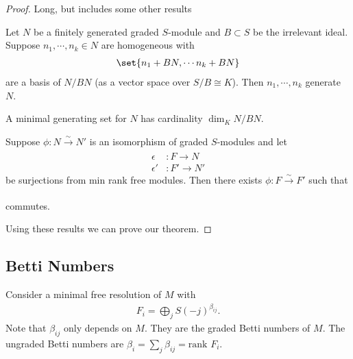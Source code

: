 \begin{proof}
    Long, but includes some other results

    \begin{lemma}
        Let $N$ be a finitely generated graded $S$-module and $B \subset S$ be the irrelevant ideal. Suppose $n_1 , \cdots, n_k \in N$ are homogeneous with
        \begin{align*}
            \set{ n_1 + BN , \cdots n_k + BN}
        \end{align*}
        are a basis of $N / BN$ (as a vector space over $S/B \cong K$). Then $n_1 , \cdots, n_k $ generate $N$.
    \end{lemma}

    \begin{corollary}
        A minimal generating set for $N$ has cardinality $\dim_K N / BN$.
    \end{corollary}

    \begin{lemma}
        Suppose $\phi : N \xrightarrow[]{\sim} N' $ is an isomorphism of graded $S $-modules and let
        \begin{align*}
            \epsilon &: F \to N\\
            \epsilon' &: F' \to N'
        \end{align*}
        be surjections from min rank free modules. Then there exists $\phi : F \xrightarrow[]{\sim} F'$ such that
        \begin{center}
        \end{center}
        commutes.
    \end{lemma}

    Using these results we can prove our theorem.
\end{proof}

\subsection{Betti Numbers}

\begin{definition}
    Consider a minimal free resolution of $M$ with
    \begin{align*}
        F_i = \bigoplus_j S(-j)^{\beta_{i j}}.
    \end{align*}
    Note that $\beta_{ij}$ only depends on $M$. They are the graded Betti numbers of $M$. The ungraded Betti numbers are $\beta_i = \sum_j \beta_{ij} = \text{rank } F_i$.
\end{definition}

